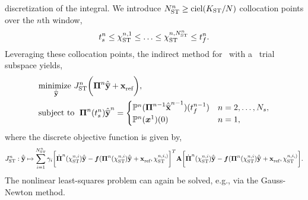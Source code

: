 discretization of the integral. We introduce $\ncollocSTArg{n} \ge \text{ciel}(\stdim / N )$ collocation points over the $n$th window, 
$$\timeStartArg{n} \le \collocPointSTArg{n}{1} \le \ldots \le \collocPointSTArg{n}{\ncollocSTArg{n}} \le \timeEndArg{n}.$$
Leveraging these collocation points, the indirect method for \methodAcronym\ with a \spaceTimeAcronym\ trial subspace yields,
\begin{equation}\label{eq:obj_gen_slab2} 
\begin{split}
&\underset{\stgenstatey}{\text{minimize }} \objectiveDiscreteSTArg{n} \bigg( \stbasisArgnt{n} \stgenstatey + \stateInterceptArg{n}  \bigg) , \\
&\text{subject to }\;  \stbasisArg{n}{\timeStartArg{n}}\stgenstateyArg{n} = \begin{cases} 
\mathbb{P}^n(\stbasisArgnt{n-1}\stgenstateArg{n-1})(\timeEndArg{n-1}) & n = 2,\ldots,\nslabs, \\ 
\mathbb{P}^n(\stateFOMArgnt{1})(0) &
n=1,
\end{cases}
\end{split} 
\end{equation}
where the discrete objective function is given by, 
$$\objectiveDiscreteSTArg{n}: \stgenstatey \mapsto \sum_{i=1}^{\ncollocSTArg{n}} \gamma_i 
\bigg[ \stbasisDotArg{n}{\collocPointSTArg{n}{i}} \stgenstateyArg{ }  - \velocity (\stbasisArg{n}{\collocPointSTArg{n}{i}} \stgenstateyArg{ } + \stateInterceptArg{n},\collocPointSTArg{n,i}) \bigg]^T 
\stweightingMatArg{n} 
\bigg[ \stbasisDotArg{n}{\collocPointSTArg{n}{i}} \stgenstateyArg{ }  - \velocity (\stbasisArg{n}{\collocPointSTArg{n}{i}} \stgenstateyArg{ } + \stateInterceptArg{n},\collocPointSTArg{n,i}) \bigg].
$$
The nonlinear least-squares problem can again be solved, e.g., via the Gauss-Newton method. 
